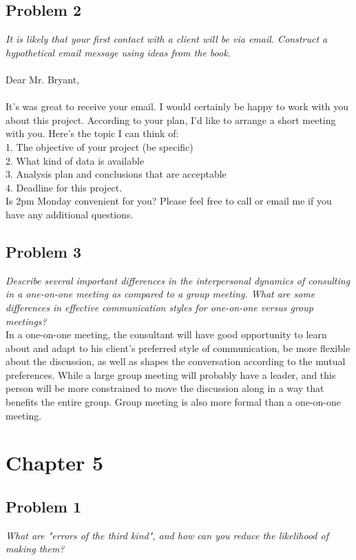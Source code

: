 \documentclass[a4paper,11pt]{article}
\begin{document}
\subsection*{Problem 2}
\emph{\indent It is likely that your first contact with a client will be via email. Construct a hypothetical email message using ideas from the book.} \\
\\
Dear Mr. Bryant,\\
\\
It's was great to receive your email. I would certainly be happy to work with you about this project. According to your plan, I'd like to arrange a short meeting with you. Here's the topic I can think of:\\
1. The objective of your project (be specific)\\
2. What kind of data is available\\
3. Analysis plan and conclusions that are acceptable\\
4. Deadline for this project.
\\
Is 2pm  Monday convenient for you? Please feel free to call or email me if you have any additional questions.

\subsection*{Problem 3}
\emph{\indent Describe several important differences in the interpersonal dynamics of consulting in a one-on-one meeting as compared to a group meeting. What are some differences in effective communication styles for one-on-one versus group meetings?}\\

In a one-on-one meeting, the consultant will have good opportunity to learn about and adapt to his client's preferred style of communication, be more flexible about the discussion,  as well as shapes the conversation according to the mutual preferences. While a large group meeting will probably have a leader, and this person will be more constrained to move the discussion along in a way that benefits the entire group. Group meeting is also more formal than a one-on-one meeting.

\section*{Chapter 5}
\subsection*{Problem 1}
\emph{\indent What are "errors of the third kind", and how can you reduce the likelihood of making them?}
\\
\end{document}
